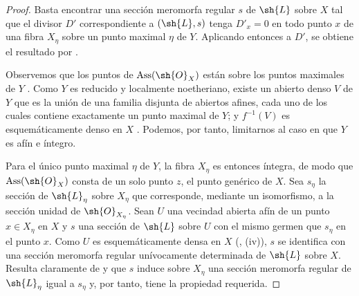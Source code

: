 \begin{proof}
Basta encontrar una sección meromorfa regular $s$ de $\sh{L}$ sobre
$X$ tal que el divisor $D'$ correspondiente a $(\sh{L},s)$ tenga
$D'_x=0$ en todo punto $x$ de una fibra $X_\eta$ sobre un punto maximal
$\eta$ de $Y$. Aplicando entonces {} a $D'$, se obtiene el resultado por
{}.

Observemos que los puntos de $\operatorname{Ass}(\sh{O}_X)$ están sobre los puntos
maximales de $Y$ {}. Como $Y$ es reducido y localmente noetheriano,
existe un abierto denso $V$ de $Y$ que es la unión de una
familia disjunta de abiertos afines, cada uno de los cuales contiene exactamente un
punto maximal de $Y$; y $f^{-1}(V)$ es esquemáticamente denso en $X$
{}. Podemos, por tanto, limitarnos al caso en que $Y$ es
afín e íntegro.

Para el único punto maximal $\eta$ de $Y$, la fibra $X_\eta$ es entonces
íntegra, de modo que $\operatorname{Ass}(\sh{O}_X)$ consta de un solo punto
$z$, el punto genérico de $X$. Sea $s_\eta$ la sección de
$\sh{L}_\eta$ sobre $X_\eta$ que corresponde, mediante un isomorfismo,
a la sección unidad de $\sh{O}_{X_\eta}$. Sean $U$ una vecindad abierta
afín de un punto $x\in X_\eta$ en $X$ y $s$ una sección
de $\sh{L}$ sobre $U$ con el mismo germen que $s_\eta$ en el punto $x$. Como $U$
es esquemáticamente densa en $X$ ({}, (iv)), $s$ se identifica con una
sección meromorfa regular unívocamente determinada de $\sh{L}$ sobre $X$.
Resulta claramente de {} y {} que $s$ induce sobre
$X_\eta$ una sección meromorfa regular de $\sh{L}_\eta$ igual a
$s_\eta$ y, por tanto, tiene la propiedad requerida.
\end{proof}
